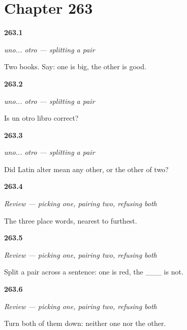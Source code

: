 \section*{Chapter 263}

\noindent\begin{minipage}[t]{\linewidth}
\raggedright
\hypertarget{review-ES-C67-uno-otro-split}{\textbf{263.1}} \emph{uno... otro — splitting a pair}\par
\small Two books. Say: one is big, the other is good.
\end{minipage}\par\medskip

\noindent\begin{minipage}[t]{\linewidth}
\raggedright
\hypertarget{review-ES-C67-uno-otro-article}{\textbf{263.2}} \emph{uno... otro — splitting a pair}\par
\small Is un otro libro correct?
\end{minipage}\par\medskip

\noindent\begin{minipage}[t]{\linewidth}
\raggedright
\hypertarget{review-ES-C67-uno-otro-latin}{\textbf{263.3}} \emph{uno... otro — splitting a pair}\par
\small Did Latin alter mean any other, or the other of two?
\end{minipage}\par\medskip

\noindent\begin{minipage}[t]{\linewidth}
\raggedright
\hypertarget{review-ES-C67-repaso-uno-otro-ninguno-distancias}{\textbf{263.4}} \emph{Review — picking one, pairing two, refusing both}\par
\small The three place words, nearest to furthest.
\end{minipage}\par\medskip

\noindent\begin{minipage}[t]{\linewidth}
\raggedright
\hypertarget{review-ES-C67-repaso-uno-otro-ninguno-pareja}{\textbf{263.5}} \emph{Review — picking one, pairing two, refusing both}\par
\small Split a pair across a sentence: one is red, the \_\_\_ is not.
\end{minipage}\par\medskip

\noindent\begin{minipage}[t]{\linewidth}
\raggedright
\hypertarget{review-ES-C67-repaso-uno-otro-ninguno-rechazo}{\textbf{263.6}} \emph{Review — picking one, pairing two, refusing both}\par
\small Turn both of them down: neither one nor the other.
\end{minipage}\par\medskip

